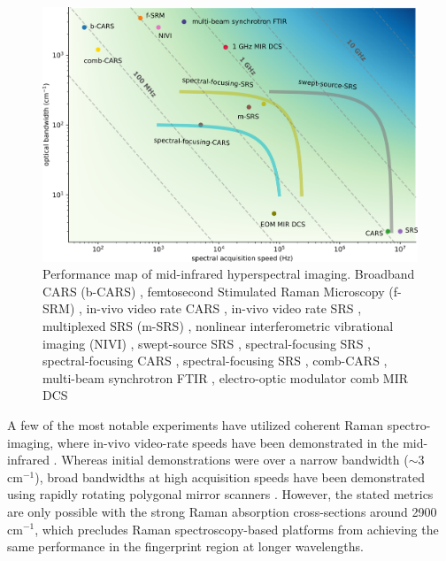 \documentclass{optica-article}
\begin{document}
\begin{figure}[h]
    \centering
    \includegraphics[width=\linewidth]{bckgnd_with_cm.png}
    \caption{Performance map of mid-infrared hyperspectral imaging. Broadband CARS (b-CARS) \cite{kee_simple_2004}, femtosecond Stimulated Raman Microscopy (f-SRM) \cite{ploetz_femtosecond_2007}, in-vivo video rate CARS \cite{evans_chemical_2005}, in-vivo video rate SRS \cite{saar_video-rate_2010}, multiplexed SRS (m-SRS) \cite{fu_quantitative_2012,liao_microsecond_2015}, nonlinear interferometric vibrational imaging (NIVI) \cite{chowdary_molecular_2010}, swept-source SRS \cite{ozeki_high-speed_2012}, spectral-focusing SRS \cite{fu_hyperspectral_2013}, spectral-focusing CARS \cite{di_napoli_hyperspectral_2014}, spectral-focusing SRS \cite{lin_microsecond_2021}, comb-CARS \cite{ideguchi_coherent_2013}, multi-beam synchrotron FTIR \cite{nasse_high-resolution_2011}, electro-optic modulator comb MIR DCS \cite{ullah_khan_direct_2020}}
    \label{fig:bckgnd}
\end{figure}

A few of the most notable experiments have utilized coherent Raman spectro-imaging, where in-vivo video-rate speeds have been demonstrated in the mid-infrared \cite{evans_chemical_2005, saar_video-rate_2010}. Whereas initial demonstrations were over a narrow bandwidth (\mbox{$\sim$3 $\mathrm{cm^{-1}}$}), broad bandwidths at high acquisition speeds have been demonstrated using rapidly rotating polygonal mirror scanners \cite{tamamitsu_ultrafast_2017, lin_microsecond_2021}. However, the stated metrics are only possible with the strong Raman absorption cross-sections around \mbox{2900 $\mathrm{cm^{-1}}$}, which precludes Raman spectroscopy-based platforms from achieving the same performance in the fingerprint region at longer wavelengths.
\end{document}
